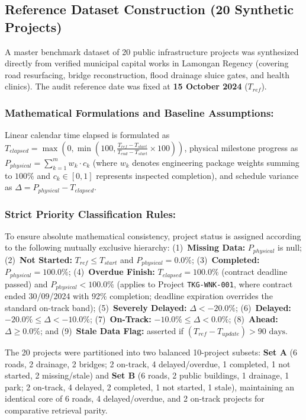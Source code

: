 \documentclass[runningheads]{llncs}
\begin{document}
\subsection{Reference Dataset Construction (20 Synthetic Projects)}
A master benchmark dataset of 20 public infrastructure projects was synthesized directly from verified municipal capital works in Lamongan Regency (covering road resurfacing, bridge reconstruction, flood drainage sluice gates, and health clinics). The audit reference date was fixed at \textbf{15 October 2024} ($T_{ref}$).

\subsubsection{Mathematical Formulations and Baseline Assumptions:}
Linear calendar time elapsed is formulated as $T_{elapsed} = \max\left(0, \min\left(100, \frac{T_{ref} - T_{start}}{T_{end} - T_{start}} \times 100\right)\right)$, physical milestone progress as $P_{physical} = \sum_{k=1}^m w_k \cdot c_k$ (where $w_k$ denotes engineering package weights summing to $100\%$ and $c_k \in [0, 1]$ represents inspected completion), and schedule variance as $\Delta = P_{physical} - T_{elapsed}$.

\subsubsection{Strict Priority Classification Rules:}
To ensure absolute mathematical consistency, project status is assigned according to the following mutually exclusive hierarchy: (1)~\textbf{Missing Data:} $P_{physical}$ is null; (2)~\textbf{Not Started:} $T_{ref} \le T_{start}$ and $P_{physical} = 0.0\%$; (3)~\textbf{Completed:} $P_{physical} = 100.0\%$; (4)~\textbf{Overdue Finish:} $T_{elapsed} = 100.0\%$ (contract deadline passed) and $P_{physical} < 100.0\%$ (applies to Project \texttt{TKG-WNK-001}, where contract ended 30/09/2024 with 92\% completion; deadline expiration overrides the standard on-track band); (5)~\textbf{Severely Delayed:} $\Delta < -20.0\%$; (6)~\textbf{Delayed:} $-20.0\% \le \Delta < -10.0\%$; (7)~\textbf{On-Track:} $-10.0\% \le \Delta < 0.0\%$; (8)~\textbf{Ahead:} $\Delta \ge 0.0\%$; and (9)~\textbf{Stale Data Flag:} asserted if $(T_{ref} - T_{update}) > 90\text{ days}$.

The 20 projects were partitioned into two balanced 10-project subsets: \textbf{Set A} (6 roads, 2 drainage, 2 bridges; 2 on-track, 4 delayed/overdue, 1 completed, 1 not started, 2 missing/stale) and \textbf{Set B} (6 roads, 2 public buildings, 1 drainage, 1 park; 2 on-track, 4 delayed, 2 completed, 1 not started, 1 stale), maintaining an identical core of 6 roads, 4 delayed/overdue, and 2 on-track projects for comparative retrieval parity.
\end{document}
